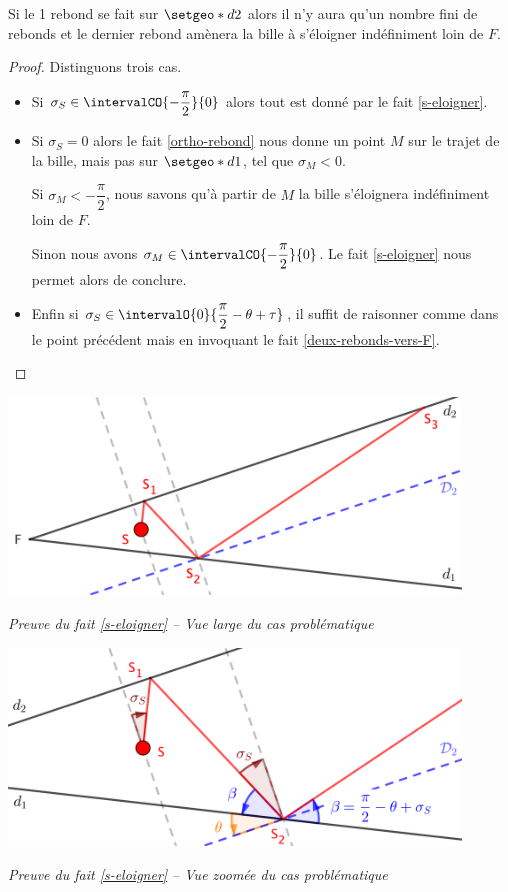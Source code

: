 \medskip


\begin{theorem}
	Si le 1\ier{} rebond se fait sur $\setgeo*{d}{2}$ alors il n'y aura qu'un nombre fini de rebonds et le dernier rebond amènera la bille à s'éloigner indéfiniment loin de $F$.
\end{theorem}

\begin{proof}
	Distinguons trois cas.
	
	\begin{itemize}[label = \textbullet]
		\item Si $\sigma_S \in \intervalCO{- \dfrac{\pi}{2}}{0}$ alors tout est donné par le fait \ref{s-eloigner}.


		\item Si $\sigma_S = 0$ alors le fait \ref{ortho-rebond} nous donne un point $M$ sur le trajet de la bille, mais pas sur $\setgeo*{d}{1}$, tel que $\sigma_M < 0$.
		
		\noindent
		Si $\sigma_M < - \dfrac{\pi}{2}$, nous savons qu'à partir de $M$ la bille s'éloignera indéfiniment loin de $F$.
		
		\noindent
		Sinon nous avons $\sigma_M \in \intervalCO{- \dfrac{\pi}{2}}{0}$.
		Le fait \ref{s-eloigner} nous permet alors de conclure.
		
		
		\item Enfin si $\sigma_S \in \intervalO{0}{\dfrac{\pi}{2} - \theta + \tau}$, il suffit de raisonner comme dans le point précédent mais en invoquant le fait \ref{deux-rebonds-vers-F}.
	\end{itemize}
\end{proof}

	
\medskip


\begin{center}
	\includegraphics[width=12cm]{content/proof-starting-with-d2-2-bounces-farway-from-F.png}

	\itshape\small
	Preuve du fait \ref{s-eloigner} -- Vue large du cas problématique
\end{center}

	
\medskip


\begin{center}
	\includegraphics[width=12cm]{content/proof-starting-with-d2-2-bounces-farway-from-F-zoom.png}

	\itshape\small
	Preuve du fait \ref{s-eloigner} -- Vue zoomée du cas problématique
\end{center}
